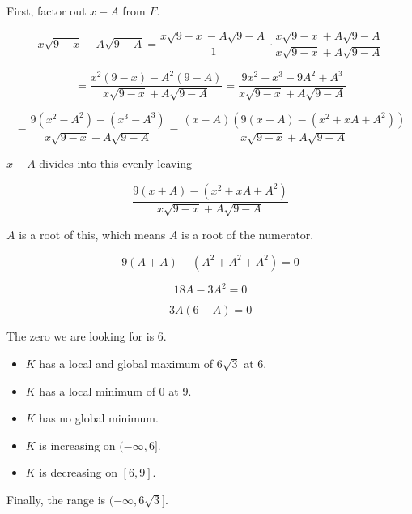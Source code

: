 \documentclass{ximera}
\begin{document}
\begin{procedure}
First, factor out $x-A$ from $F$.


\[
x\sqrt{9-x} - A\sqrt{9-A} = \frac{x\sqrt{9-x} - A\sqrt{9-A}}{1} \cdot \frac{x\sqrt{9-x} + A\sqrt{9-A}}{x\sqrt{9-x} + A\sqrt{9-A}}
\]

\[
= \frac{x^2 (9-x) - A^2 (9-A)}{x\sqrt{9-x} + A\sqrt{9-A}} = \frac{9x^2 - x^3 - 9A^2 + A^3}{x\sqrt{9-x} + A\sqrt{9-A}}
\]


\[
= \frac{9(x^2-A^2) - (x^3 - A^3)}{x\sqrt{9-x} + A\sqrt{9-A}} = \frac{(x-A)(9(x+A)-(x^2 + xA + A^2))}{x\sqrt{9-x} + A\sqrt{9-A}}
\]


$x-A$ divides into this evenly leaving

\[
\frac{9(x+A)-(x^2 + xA + A^2)}{x\sqrt{9-x} + A\sqrt{9-A}}
\]

$A$ is a root of this, which means $A$ is a root of the numerator.


\[
9(A+A)-(A^2 + A^2 + A^2) = 0
\]

\[
18A - 3A^2 = 0
\]

\[
3A(6-A) = 0
\]


The zero we are looking for is $6$.


\end{procedure}


\begin{itemize}
\item $K$ has a local and global maximum of $6\sqrt{3}$ at $6$.
\item $K$ has a local minimum of $0$ at $9$.
\item $K$ has no global minimum.
\end{itemize}




\begin{itemize}
\item $K$ is increasing on $(-\infty, 6]$.
\item $K$ is decreasing on $[6, 9]$.
\end{itemize}


Finally, the range is $(-\infty, 6\sqrt{3}]$. \\
\end{document}
